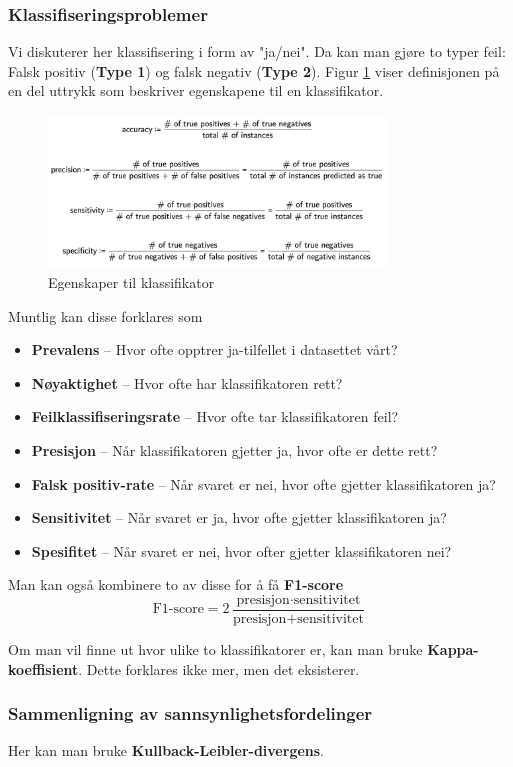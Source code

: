 \subsubsection{Klassifiseringsproblemer}
Vi diskuterer her klassifisering i form av "ja/nei". Da kan man gjøre to typer feil: Falsk positiv (\textbf{Type 1}) og falsk negativ (\textbf{Type 2}). Figur \ref{fig:klassifisering} viser definisjonen på en del uttrykk som beskriver egenskapene til en klassifikator.

\begin{figure}[h]
\centering
\includegraphics[width=0.8\textwidth]{Figurer/klassifisering.png}
\caption{Egenskaper til klassifikator}
\label{fig:klassifisering}
\end{figure}

Muntlig kan disse forklares som
\begin{itemize}
\item \textbf{Prevalens} -- Hvor ofte opptrer ja-tilfellet i datasettet vårt?
\item \textbf{Nøyaktighet} -- Hvor ofte har klassifikatoren rett?
\item \textbf{Feilklassifiseringsrate} -- Hvor ofte tar klassifikatoren feil?
\item \textbf{Presisjon} -- Når klassifikatoren gjetter ja, hvor ofte er dette rett?
\item \textbf{Falsk positiv-rate} -- Når svaret er nei, hvor ofte gjetter klassifikatoren ja?
\item \textbf{Sensitivitet} -- Når svaret er ja, hvor ofte gjetter klassifikatoren ja?
\item \textbf{Spesifitet} -- Når svaret er nei, hvor ofter gjetter klassifikatoren nei?
\end{itemize}

Man kan også kombinere to av disse for å få \textbf{F1-score}
\begin{equation}
\textrm{F1-score} = 2 \frac{\textrm{presisjon} \cdot \textrm{
sensitivitet}}{\textrm{presisjon} + \textrm{
sensitivitet}}
\end{equation}

Om man vil finne ut hvor ulike to klassifikatorer er, kan man bruke \textbf{Kappa-koeffisient}. Dette forklares ikke mer, men det eksisterer.

\subsubsection{Sammenligning av sannsynlighetsfordelinger}
Her kan man bruke \textbf{Kullback-Leibler-divergens}.